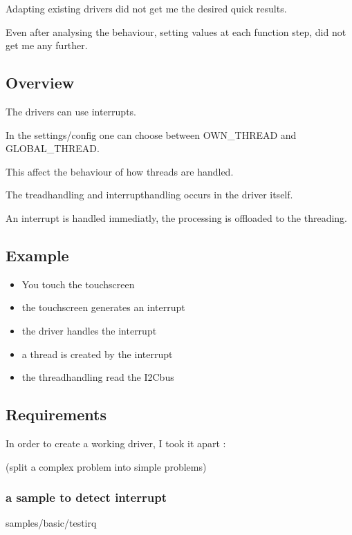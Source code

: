 \documentclass[letterpaper,10pt,english]{sphinxmanual}
\begin{document}
Adapting existing drivers did not get me the desired quick results.

Even after analysing the behaviour, setting values at each function step, did not get me any further.


\subsection{Overview}
\label{\detokenize{behind/troubleshoot:overview}}
The drivers can use interrupts.

In the settings/config one can choose between OWN\_THREAD and GLOBAL\_THREAD.

This affect the behaviour of how threads are handled.

The tread\sphinxhyphen{}handling and interrupt\sphinxhyphen{}handling occurs in the driver itself.

An interrupt is handled immediatly, the processing is offloaded to the threading.


\subsection{Example}
\label{\detokenize{behind/troubleshoot:example}}\begin{itemize}
\item {} 
You touch the touchscreen

\item {} 
the touchscreen generates an interrupt

\item {} 
the driver handles the interrupt

\item {} 
a thread is created by the interrupt

\item {} 
the threadhandling read the I2C\sphinxhyphen{}bus

\end{itemize}


\subsection{Requirements}
\label{\detokenize{behind/troubleshoot:requirements}}
In order to create a working driver, I took it apart :

(split a complex problem into simple problems)


\subsubsection{a sample to detect interrupt}
\label{\detokenize{behind/troubleshoot:a-sample-to-detect-interrupt}}
samples/basic/testirq
\end{document}
